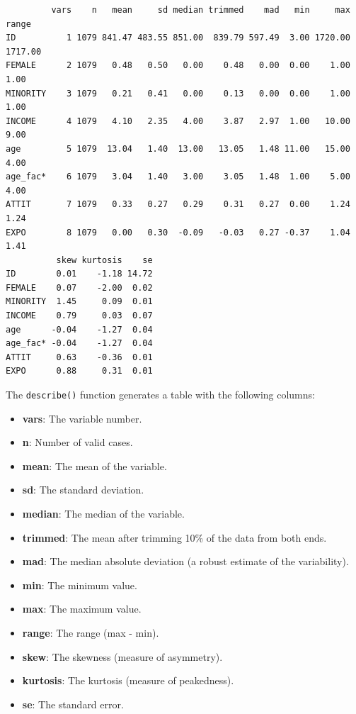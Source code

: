 \documentclass[
  letterpaper,
  DIV=11,
  numbers=noendperiod]{scrreprt}
\providecommand{\tightlist}{%
  \setlength{\itemsep}{0pt}\setlength{\parskip}{0pt}}\usepackage{longtable,booktabs,array}
\begin{document}
\begin{verbatim}
         vars    n   mean     sd median trimmed    mad   min     max   range
ID          1 1079 841.47 483.55 851.00  839.79 597.49  3.00 1720.00 1717.00
FEMALE      2 1079   0.48   0.50   0.00    0.48   0.00  0.00    1.00    1.00
MINORITY    3 1079   0.21   0.41   0.00    0.13   0.00  0.00    1.00    1.00
INCOME      4 1079   4.10   2.35   4.00    3.87   2.97  1.00   10.00    9.00
age         5 1079  13.04   1.40  13.00   13.05   1.48 11.00   15.00    4.00
age_fac*    6 1079   3.04   1.40   3.00    3.05   1.48  1.00    5.00    4.00
ATTIT       7 1079   0.33   0.27   0.29    0.31   0.27  0.00    1.24    1.24
EXPO        8 1079   0.00   0.30  -0.09   -0.03   0.27 -0.37    1.04    1.41
          skew kurtosis    se
ID        0.01    -1.18 14.72
FEMALE    0.07    -2.00  0.02
MINORITY  1.45     0.09  0.01
INCOME    0.79     0.03  0.07
age      -0.04    -1.27  0.04
age_fac* -0.04    -1.27  0.04
ATTIT     0.63    -0.36  0.01
EXPO      0.88     0.31  0.01
\end{verbatim}

The \texttt{describe()} function generates a table with the following
columns:

\begin{itemize}
\tightlist
\item
  \textbf{vars}: The variable number.
\item
  \textbf{n}: Number of valid cases.
\item
  \textbf{mean}: The mean of the variable.
\item
  \textbf{sd}: The standard deviation.
\item
  \textbf{median}: The median of the variable.
\item
  \textbf{trimmed}: The mean after trimming 10\% of the data from both
  ends.
\item
  \textbf{mad}: The median absolute deviation (a robust estimate of the
  variability).
\item
  \textbf{min}: The minimum value.
\item
  \textbf{max}: The maximum value.
\item
  \textbf{range}: The range (max - min).
\item
  \textbf{skew}: The skewness (measure of asymmetry).
\item
  \textbf{kurtosis}: The kurtosis (measure of peakedness).
\item
  \textbf{se}: The standard error.
\end{itemize}
\end{document}

